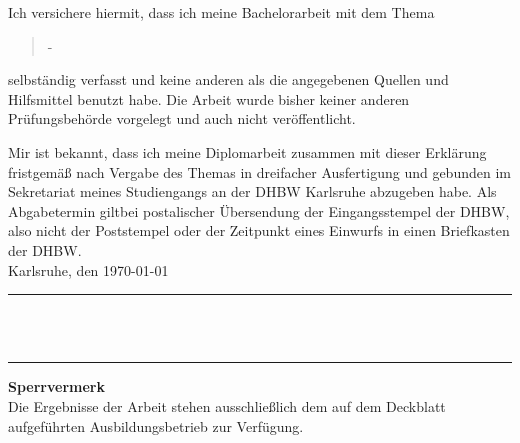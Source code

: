 Ich versichere hiermit, dass ich meine Bachelorarbeit mit dem Thema
\begin{quote}
\textit{\titel} -\textit{ \untertitel }
\end{quote}
selbständig verfasst und keine anderen als die angegebenen Quellen und Hilfsmittel benutzt habe. Die Arbeit wurde bisher keiner anderen Prüfungsbehörde vorgelegt und auch nicht veröffentlicht.


Mir ist bekannt, dass ich meine Diplomarbeit zusammen mit dieser Erklärung fristgemäß nach Vergabe des Themas in dreifacher Ausfertigung und gebunden im Sekretariat meines Studiengangs an der DHBW Karlsruhe abzugeben habe. Als Abgabetermin giltbei postalischer Übersendung der Eingangsstempel der DHBW, also nicht der Poststempel oder der Zeitpunkt eines
Einwurfs in einen Briefkasten der DHBW.\\[10ex]

Karlsruhe, den \today \\[4ex]


\rule[-0.2cm]{5cm}{0.5pt} \\

\textsc{\autor} \\[10ex]

\hrule 
\vspace*{1.0cm}
\noindent \textbf{\Large{Sperrvermerk}}\\
\normalsize
Die Ergebnisse der Arbeit stehen ausschließlich dem auf dem Deckblatt aufgeführten Ausbildungsbetrieb zur Verfügung.